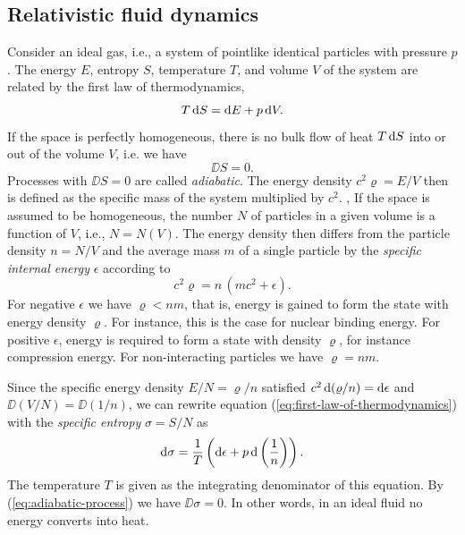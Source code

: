 \subsection{Relativistic fluid dynamics}
Consider an ideal gas, i.e., a system of pointlike identical particles with pressure $p$. The energy $E$, entropy $S$, temperature $T$, and volume $V$ of the system are related by the %
first law of thermodynamics,
\begin{equation}
	T \,\mathrm{d} S = \mathrm{d} E + p \,\mathrm{d} V
	.
	\label{eq:first-law-of-thermodynamics}
\end{equation}
If the space is perfectly homogeneous, there is no bulk flow of heat $T \,\mathrm{d} S$ into or out of the volume $V$, i.e. we have
\begin{equation}
	\DD S = 0.
	\label{eq:adiabatic-process}
\end{equation}
Processes with $\DD S = 0$ are called \emph{adiabatic}. \cite[58]{Ryden-2017}
The energy density $c^2\varrho = E/V$ then is defined as the specific mass of the system multiplied by $c^2$. \cite[434]{Landau-Lifschitz-1997}, \cite[55]{Ryden-2017}
If the space is assumed to be homogeneous, the number $N$ of particles in a given volume is a function of $V$, i.e., $N = N(V)$.
The energy density then differs from the particle 
density $n=N/V$ and the average mass $m$ of a single particle by the \emph{specific internal energy}
$\epsilon$ according to
\begin{equation}
	c^2 \varrho
	= n \, (mc^2 + \epsilon)
	.
\end{equation}
For negative $\epsilon$ we have $\varrho < nm$, that is, energy is gained to form the state with energy density $\varrho$. For instance, this is the case for nuclear binding energy.
For positive $\epsilon$, energy is required to form a state with density $\varrho$, for instance compression energy.
For non-interacting particles we have $\varrho = nm$.

Since the specific energy density $E/N = \varrho/n$ satisfied $c^2 \,\mathrm{d} (\varrho/n) = \mathrm{d} \epsilon$
and $\DD (V/N) = \DD (1/n)$,
we can rewrite equation (\ref{eq:first-law-of-thermodynamics}) with  the \emph{specific entropy} $\sigma = S/N$ as
\begin{equation}
	\mathrm{d} \sigma
	= \frac{1}{T} \left( \mathrm{d} \epsilon + p \,\mathrm{d} \left( \frac{1}{n} \right) \right)
	.
\end{equation}
The temperature $T$ is given as the integrating denominator of this equation.
%
By (\ref{eq:adiabatic-process}) we have
%
$\DD \sigma = 0$. In other words, in an ideal fluid no energy converts into heat.

